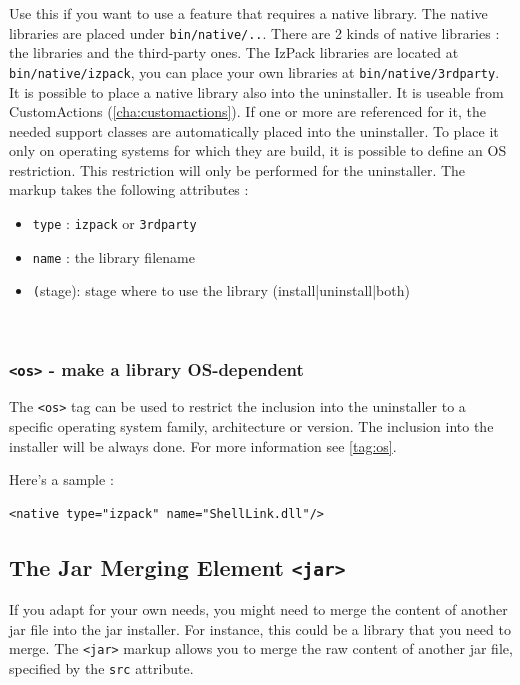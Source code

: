 Use this if you want to use a feature that requires a native library.
The native libraries are placed under \texttt{bin/native/..}. There are 2
kinds of native libraries : the \IzPack libraries and the third-party
ones. The IzPack libraries are located at \texttt{bin/native/izpack},
you can place your own libraries at \texttt{bin/native/3rdparty}. 
It is possible to place a native library also into the uninstaller. 
It is useable from CustomActions (\ref{cha:customactions}). If one or 
more are referenced for it, the needed support classes are automatically
placed into the uninstaller. To place it only on operating systems
for which they are build, it is possible to define an OS
restriction. This restriction will only be performed for the
uninstaller. The markup takes the following attributes :\begin{itemize}

  \item \texttt{type} : \texttt{izpack} or \texttt{3rdparty}
  \item \texttt{name} : the library filename
  \item \texttt(stage): stage where to use the library
  (install|uninstall|both)

\end{itemize}\
\subsubsection{\texttt{<os>} - make a library OS-dependent}

The \texttt{<os>} tag can be used to restrict the inclusion into
the uninstaller to a specific operating system family,
architecture or version. The inclusion into the installer will be
always done. For more information see \ref{tag:os}.

Here's a sample :
\footnotesize
\begin{verbatim}
<native type="izpack" name="ShellLink.dll"/>
\end{verbatim}
\normalsize

\subsection{The Jar Merging Element \texttt{<jar>}}
\label{jar-element}

If you adapt \IzPack for your own needs, you might need to merge the
content of another jar file into the jar installer. For instance, this
could be a library that you need to merge. The \texttt{<jar>} markup
allows you to merge the raw content of another jar file, specified by
the \texttt{src} attribute.\\

